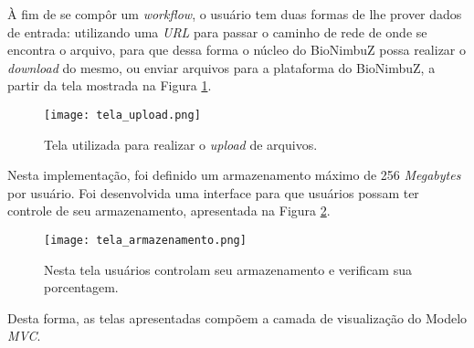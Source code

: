 \noindent
À fim de se compôr um \textit{workflow}, o usuário tem duas formas de lhe prover dados de entrada: utilizando uma \textit{URL} para passar o caminho de rede de onde se encontra o arquivo, para que dessa forma o núcleo do BioNimbuZ possa realizar o \textit{download} do mesmo, ou enviar arquivos para a plataforma do BioNimbuZ, a partir da tela mostrada na Figura \ref{fig:tela_upload}. 

\begin{figure}[H]
	\centering
	\texttt{[image: tela\_upload.png]}
	\caption{Tela utilizada para realizar o \textit{upload} de arquivos.}
	\label{fig:tela_upload}
\end{figure}

Nesta implementação, foi definido um armazenamento máximo de 256 \textit{Megabytes} por usuário. Foi desenvolvida uma interface para que usuários possam ter controle de seu armazenamento, apresentada na Figura \ref{fig:tela_armazenamento}.

\begin{figure}[H]
	\centering
	\texttt{[image: tela\_armazenamento.png]}
	\caption{Nesta tela usuários controlam seu armazenamento e verificam sua porcentagem.}
	\label{fig:tela_armazenamento}
\end{figure}

Desta forma, as telas apresentadas compõem a camada de visualização do Modelo \textit{MVC}.